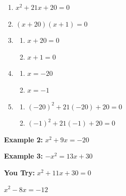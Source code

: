 \documentclass[11pt]{article}
\begin{document}
	\begin{enumerate}
		\item $ x^2+21x+20=0$\\
		
		\item $ (x+20)(x+1)=0$\\
		
		\item 	\begin{enumerate}
			\item $x+20=0$\\
			
			\item $x+1=0$ \\
			
		\end{enumerate}
		
		\item  \begin{enumerate}
			\item  $x=-20$\\
			
			\item $x=-1$\\
		\end{enumerate}
		
		
		\item \begin{enumerate}
			\item $(-20)^2+21(-20)+20=0$\\
			
			\item $(-1)^2+21(-1)+20=0$\\
		\end{enumerate}
	\end{enumerate}

\pagebreak

\textbf{Example 2:} $x^2+9x=-20$\\


\vspace{2in}

\textbf{Example 3:} $-x^2=13x+30$\\

\vspace{2in}

\textbf{You Try:} $x^2+11x+30=0$\\

\vspace{2in}

$x^2-8x=-12$

\pagebreak
\end{document}
